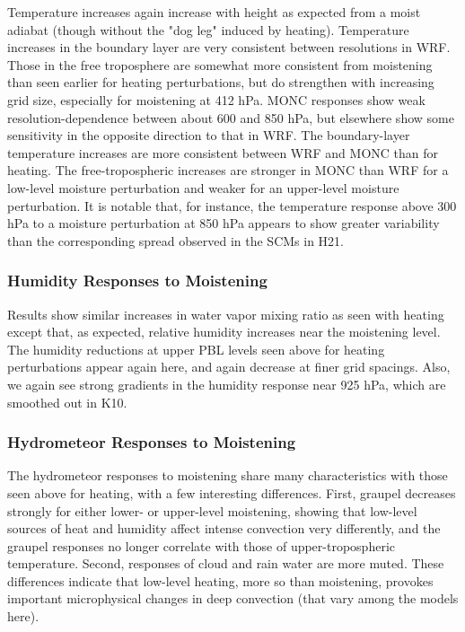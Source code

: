 \documentclass[draft]{agujournal2019}
\begin{document}
Temperature increases again increase with height as expected from a moist
adiabat (though without the "dog leg" induced by heating).  Temperature
increases in the boundary layer are very consistent between resolutions in WRF.
Those in the free troposphere are somewhat more consistent from moistening than
seen earlier for heating perturbations, but do strengthen with increasing grid
size, especially for moistening at 412 hPa. MONC responses show weak
resolution-dependence between about 600 and 850 hPa, but elsewhere show some
sensitivity in the opposite direction to that in WRF. The boundary-layer
temperature increases are more consistent between WRF and MONC than for heating.
The free-tropospheric increases are stronger in MONC than WRF for a low-level
moisture perturbation and weaker for an upper-level moisture perturbation. It is
notable that, for instance, the temperature response above 300 hPa to a moisture
perturbation at 850 hPa appears to show greater variability than the
corresponding spread observed in the SCMs in H21.

\subsubsection{Humidity Responses to Moistening}

Results show similar increases in water vapor mixing ratio as seen with heating
except that, as expected, relative humidity increases near the moistening level.
The humidity reductions at upper PBL levels seen above for heating perturbations
appear again here, and again decrease at finer grid spacings. Also, we again see
strong gradients in the humidity response near 925 hPa, which are smoothed out
in K10.

\subsubsection{Hydrometeor Responses to Moistening}

The hydrometeor responses to moistening share many characteristics with those
seen above for heating, with a few interesting differences.  First, graupel
decreases strongly for either lower- or upper-level moistening, showing that
low-level sources of heat and humidity affect intense convection very
differently, and the graupel responses no longer correlate with those of
upper-tropospheric temperature.  Second, responses of cloud and rain water are
more muted. These differences indicate that low-level heating, more so than
moistening, provokes important microphysical changes in deep convection (that
vary among the models here).
\end{document}
